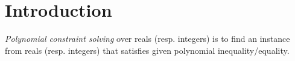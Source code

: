 \documentclass[runningheads,a4paper,oribibl]{llncs}
\begin{document}
%



\section{Introduction}
{\em Polynomial constraint solving} over reals (resp. integers) is to find an instance from reals
(resp. integers) that satisfies given polynomial inequality/equality. 
%
\end{document}
